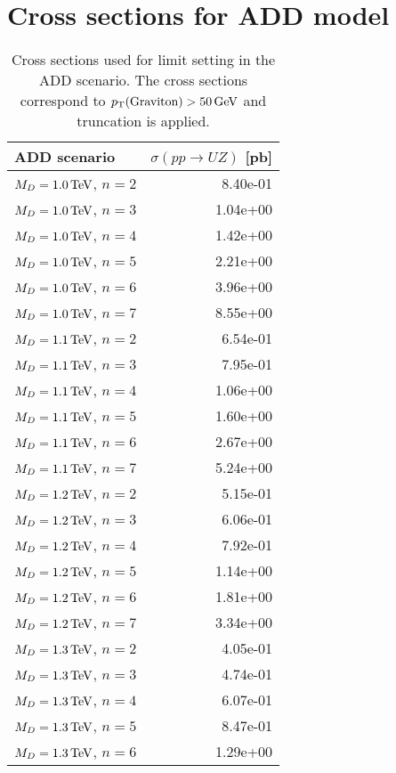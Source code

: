\chapter{Cross sections for ADD model}
\label{app:add_xs}

\begin{table}[hbtp]
  \caption{
    Cross sections used for limit setting in the ADD scenario. The cross sections correspond to $p_{\mathrm{T}}(\rm Graviton) > 50\,\text{Ge\hspace{-.08em}V}$ and truncation is applied.
  }
  \label{tab:add_xs1}
  \begin{center}
{\footnotesize
  \begin{tabular}{lr}
\hline 
ADD scenario              & $\sigma(pp\rightarrow UZ)$ [pb]\\
\hline
$M_{D} = 1.0 \,\text{Te\hspace{-.08em}V}$, $n=2$  & 8.40e-01 \\
$M_{D} = 1.0 \,\text{Te\hspace{-.08em}V}$, $n=3$  & 1.04e+00 \\
$M_{D} = 1.0 \,\text{Te\hspace{-.08em}V}$, $n=4$  & 1.42e+00 \\
$M_{D} = 1.0 \,\text{Te\hspace{-.08em}V}$, $n=5$  & 2.21e+00 \\
$M_{D} = 1.0 \,\text{Te\hspace{-.08em}V}$, $n=6$  & 3.96e+00 \\
$M_{D} = 1.0 \,\text{Te\hspace{-.08em}V}$, $n=7$  & 8.55e+00 \\
$M_{D} = 1.1 \,\text{Te\hspace{-.08em}V}$, $n=2$  & 6.54e-01 \\
$M_{D} = 1.1 \,\text{Te\hspace{-.08em}V}$, $n=3$  & 7.95e-01 \\
$M_{D} = 1.1 \,\text{Te\hspace{-.08em}V}$, $n=4$  & 1.06e+00 \\
$M_{D} = 1.1 \,\text{Te\hspace{-.08em}V}$, $n=5$  & 1.60e+00 \\
$M_{D} = 1.1 \,\text{Te\hspace{-.08em}V}$, $n=6$  & 2.67e+00 \\
$M_{D} = 1.1 \,\text{Te\hspace{-.08em}V}$, $n=7$  & 5.24e+00 \\
$M_{D} = 1.2 \,\text{Te\hspace{-.08em}V}$, $n=2$  & 5.15e-01 \\
$M_{D} = 1.2 \,\text{Te\hspace{-.08em}V}$, $n=3$  & 6.06e-01 \\
$M_{D} = 1.2 \,\text{Te\hspace{-.08em}V}$, $n=4$  & 7.92e-01 \\
$M_{D} = 1.2 \,\text{Te\hspace{-.08em}V}$, $n=5$  & 1.14e+00 \\
$M_{D} = 1.2 \,\text{Te\hspace{-.08em}V}$, $n=6$  & 1.81e+00 \\
$M_{D} = 1.2 \,\text{Te\hspace{-.08em}V}$, $n=7$  & 3.34e+00 \\
$M_{D} = 1.3 \,\text{Te\hspace{-.08em}V}$, $n=2$  & 4.05e-01 \\
$M_{D} = 1.3 \,\text{Te\hspace{-.08em}V}$, $n=3$  & 4.74e-01 \\
$M_{D} = 1.3 \,\text{Te\hspace{-.08em}V}$, $n=4$  & 6.07e-01 \\
$M_{D} = 1.3 \,\text{Te\hspace{-.08em}V}$, $n=5$  & 8.47e-01 \\
$M_{D} = 1.3 \,\text{Te\hspace{-.08em}V}$, $n=6$  & 1.29e+00 \\

\end{tabular}}
\end{center}
\end{table}
